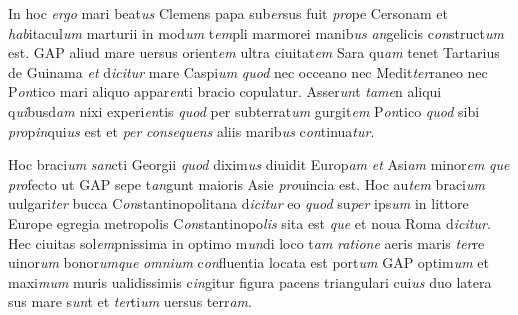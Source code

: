 \documentclass[12pt, a4paper]{book}
\newcommand{\styleabbr}[1]{\textit{#1}}
\begin{document}
	\pend
	
				
	\pstart
	
					In hoc \styleabbr{ergo} mari beat\styleabbr{us} Clemens papa sub\styleabbr{er}sus fuit \styleabbr{pro}pe Cersonam
					et \styleabbr{hab}itacul\styleabbr{um} marturii in mod\styleabbr{um} t\styleabbr{em}pli marmorei manib\styleabbr{us} \styleabbr{an}gelicis c\styleabbr{on}struct\styleabbr{um} est.
					GAP aliud mare uersus orient\styleabbr{em} ultra ciuitat\styleabbr{em} Sara qu\styleabbr{am} tenet Tartarius
					de Guinama \styleabbr{et} d\styleabbr{icitur} mare Caspi\styleabbr{um} \styleabbr{quod} nec occeano nec Medit\styleabbr{ter}raneo nec P\styleabbr{on}tico mari
					aliquo appar\styleabbr{en}ti bracio copulatur. Asser\styleabbr{un}t \styleabbr{tame}n aliqui q\styleabbr{ui}busd\styleabbr{am} nixi experi\styleabbr{en}tis
					\styleabbr{quod}  per subterrat\styleabbr{um} gurgit\styleabbr{em} P\styleabbr{on}tico \styleabbr{quod} sibi \styleabbr{pro}p\styleabbr{in}qui\styleabbr{us} est et \styleabbr{per} \styleabbr{consequens} aliis marib\styleabbr{us}
					c\styleabbr{on}tinua\styleabbr{tur}.
				
	\pend
	
				
	\pstart
	
					Hoc braci\styleabbr{um} \styleabbr{san}cti Georgii \styleabbr{quod} dixim\styleabbr{us} diuidit Europ\styleabbr{am} \styleabbr{et} Asi\styleabbr{am} minor\styleabbr{em}
					\styleabbr{que} \styleabbr{pro}fecto ut GAP sepe t\styleabbr{an}gunt maioris Asie \styleabbr{pro}uincia est. Hoc au\styleabbr{tem} braci\styleabbr{um}
					uulgari\styleabbr{ter} bucca C\styleabbr{on}stantinopolitana d\styleabbr{icitur} eo \styleabbr{quod} su\styleabbr{per} ips\styleabbr{um} in littore Europe egregia
					metropolis C\styleabbr{on}stantinopo\styleabbr{lis} sita est \styleabbr{que} et noua Roma d\styleabbr{icitur}. Hec ciuitas sol\styleabbr{em}pnissima
					in optimo m\styleabbr{un}di loco t\styleabbr{am} \styleabbr{ratione} aeris maris \styleabbr{ter}re uinor\styleabbr{um} bonor\styleabbr{um}\styleabbr{que} \styleabbr{omnium}
					c\styleabbr{on}fluentia locata est port\styleabbr{um} GAP optim\styleabbr{um} et maxi\styleabbr{mum} muris ualidissimis
					c\styleabbr{in}gitur figura pacens triangulari cui\styleabbr{us} duo latera \styleabbr{}sus mare s\styleabbr{un}t et \styleabbr{ter}ti\styleabbr{um}
					uersus terr\styleabbr{am}.
				
	\pend
	
				
	\pstart
	
\end{document}
